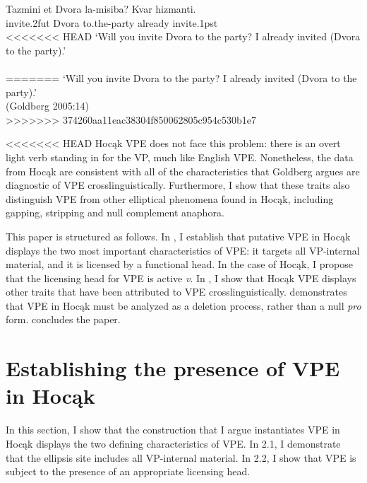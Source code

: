\documentclass[output=paper]{LSP/langsci}
\begin{document}
\begin{singlespacing}
\begin{exe}
\ex
\gll Tazmini {et Dvora} la-misiba? Kvar hizmanti.\\
invite.{\textsc 2fut} Dvora to.the-party already invite.{\textsc 1pst}\\
<<<<<<< HEAD
\trans `Will you invite Dvora to the party? I already invited (Dvora to the party).' \\\citep[14]{Goldberg2005}\\
=======
\trans `Will you invite Dvora to the party? I already invited (Dvora to the party).' \\(Goldberg 2005:14)\\
>>>>>>> 374260aa11eac38304f850062805c954c530b1e7
\vspace{-12pt}
\end{exe}
\end{singlespacing}

<<<<<<< HEAD
Hocąk VPE does not face this problem: there is an overt light verb standing in for the VP, much like English VPE. Nonetheless, the data from Hocąk are consistent with all of the characteristics that Goldberg argues are diagnostic of VPE crosslinguistically. Furthermore, I show that these traits also distinguish VPE from other elliptical phenomena found in Hocąk, including gapping, stripping and null complement anaphora. 

This paper is structured as follows. In , I establish that putative VPE in Hocąk displays the two most important characteristics of VPE: it targets all VP-internal material, and it is licensed by a functional head. In the case of Hocąk, I propose that the licensing head for VPE is active \emph{v}. In , I show that Hocąk VPE displays other traits that have been attributed to VPE crosslinguistically.  demonstrates that VPE in Hocąk must be analyzed as a deletion process, rather than a null \emph{pro} form.  concludes the paper.

\section{Establishing the presence of VPE in Hocąk}

In this section, I show that the construction that I argue instantiates VPE in Hocąk displays the two defining characteristics of VPE. In 2.1, I demonstrate that the ellipsis site includes all VP-internal material. In 2.2, I show that VPE is subject to the presence of an appropriate licensing head.
\end{document}
